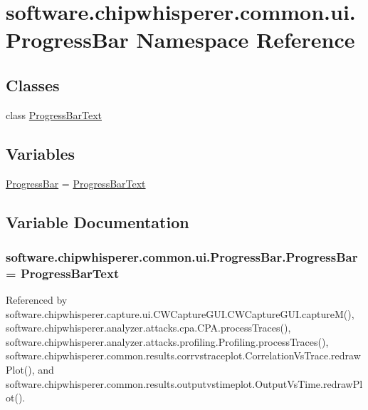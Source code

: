 \hypertarget{namespacesoftware_1_1chipwhisperer_1_1common_1_1ui_1_1ProgressBar}{}\section{software.\+chipwhisperer.\+common.\+ui.\+Progress\+Bar Namespace Reference}
\label{namespacesoftware_1_1chipwhisperer_1_1common_1_1ui_1_1ProgressBar}
\subsection*{Classes}
\begin{DoxyCompactItemize}
\item 
class \hyperlink{classsoftware_1_1chipwhisperer_1_1common_1_1ui_1_1ProgressBar_1_1ProgressBarText}{Progress\+Bar\+Text}
\end{DoxyCompactItemize}
\subsection*{Variables}
\begin{DoxyCompactItemize}
\item 
\hyperlink{namespacesoftware_1_1chipwhisperer_1_1common_1_1ui_1_1ProgressBar_a378a399b50b3d116fc08a53eaa642148}{Progress\+Bar} = \hyperlink{classsoftware_1_1chipwhisperer_1_1common_1_1ui_1_1ProgressBar_1_1ProgressBarText}{Progress\+Bar\+Text}
\end{DoxyCompactItemize}


\subsection{Variable Documentation}
\hypertarget{namespacesoftware_1_1chipwhisperer_1_1common_1_1ui_1_1ProgressBar_a378a399b50b3d116fc08a53eaa642148}{}
\subsubsection[{Progress\+Bar}]{\setlength{\rightskip}{0pt plus 5cm}software.\+chipwhisperer.\+common.\+ui.\+Progress\+Bar.\+Progress\+Bar = {\bf Progress\+Bar\+Text}}\label{namespacesoftware_1_1chipwhisperer_1_1common_1_1ui_1_1ProgressBar_a378a399b50b3d116fc08a53eaa642148}


Referenced by software.\+chipwhisperer.\+capture.\+ui.\+C\+W\+Capture\+G\+U\+I.\+C\+W\+Capture\+G\+U\+I.\+capture\+M(), software.\+chipwhisperer.\+analyzer.\+attacks.\+cpa.\+C\+P\+A.\+process\+Traces(), software.\+chipwhisperer.\+analyzer.\+attacks.\+profiling.\+Profiling.\+process\+Traces(), software.\+chipwhisperer.\+common.\+results.\+corrvstraceplot.\+Correlation\+Vs\+Trace.\+redraw\+Plot(), and software.\+chipwhisperer.\+common.\+results.\+outputvstimeplot.\+Output\+Vs\+Time.\+redraw\+Plot().

